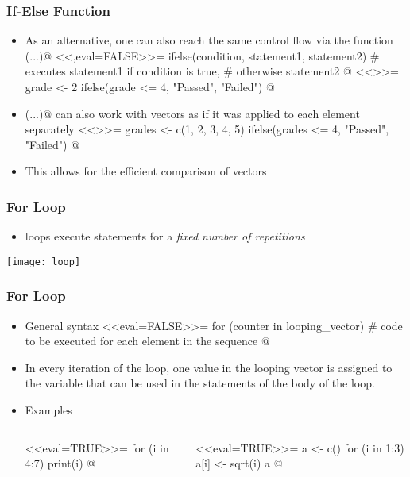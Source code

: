 \documentclass[%
  final,
  11pt, 
  show notes, %
  t, %
  fleqn, %
]{beamer}
\begin{document}
\begin{frame}[fragile]
  \frametitle{If-Else Function}
\begin{itemize}
\item As an alternative, one can also reach the same control flow via the function \verb@ifelse(...)@ 
<<,eval=FALSE>>=
ifelse(condition, statement1, statement2) 
# executes statement1 if condition is true, 
# otherwise statement2
@
<<>>=
grade <- 2
ifelse(grade <= 4, "Passed", "Failed")
@
\item \verb@ifelse(...)@ can also work with vectors as if it was applied to each element separately
<<>>=
grades <- c(1, 2, 3, 4, 5)
ifelse(grades <= 4, "Passed", "Failed")
@
\item This allows for the efficient comparison of vectors
\end{itemize}
\end{frame}

\begin{frame}[fragile]
  \frametitle{For Loop}
\begin{itemize}
\item \verb@for@ loops execute statements for a \emph{fixed number of repetitions}
\end{itemize}

\begin{center}
\texttt{[image: loop]}
\end{center}
\end{frame}

\begin{frame}[fragile]
  \frametitle{For Loop}
\begin{itemize}
\item General syntax
<<eval=FALSE>>=
for (counter in looping_vector){
  # code to be executed for each element in the sequence
}
@
\item In every iteration of the loop, one value in the looping vector is assigned to the \verb@counter@ variable that can be used in the statements of the body of the loop. 
\item Examples
\begin{columns}[T]
\begin{column}{.3\textwidth}
<<eval=TRUE>>=
for (i in 4:7) {
  print(i)
}
@
\end{column}
\begin{column}{.5\textwidth}
<<eval=TRUE>>=
a <- c()
for (i in 1:3){
  a[i] <- sqrt(i)
}
a
@
\end{column}
\end{columns}	
\end{itemize}
\end{frame}
\end{document}

